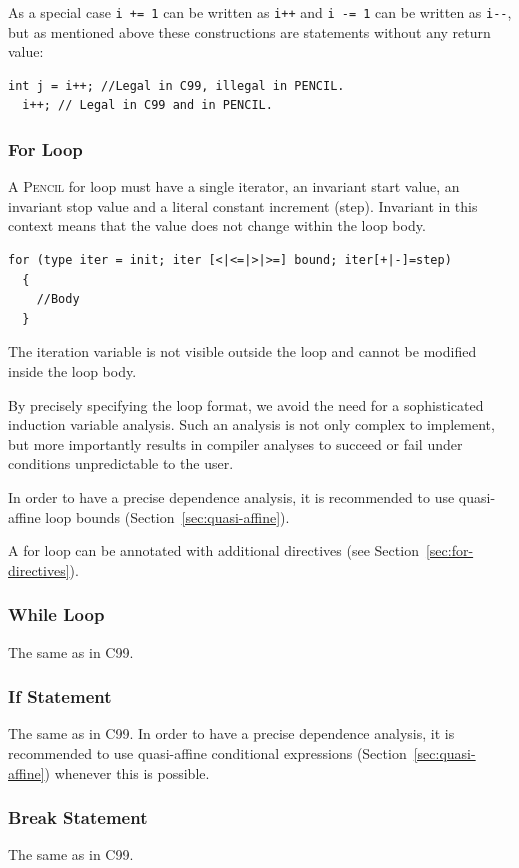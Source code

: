 \documentclass{carp}
\newcommand\pencil{\textsc{Pencil}\xspace}
\newcommand{\C}{C99\xspace}
\begin{document}
As a special case \lstinline!i += 1! can be written as \lstinline!i++!
and \lstinline!i -= 1! can be written as \lstinline!i--!, but as mentioned
above these constructions are statements without any return value:

\begin{lstlisting}[language=pencil]
  int j = i++; //Legal in C99, illegal in PENCIL.
  i++; // Legal in C99 and in PENCIL.
\end{lstlisting}

\subsubsection{For Loop}

A \pencil for loop must have a single iterator, an invariant start
value, an invariant stop value and a literal constant increment (step).
Invariant in this context means that the value does not change within
the loop body.

\begin{lstlisting}[language=pencil]
  for (type iter = init; iter [<|<=|>|>=] bound; iter[+|-]=step)
  {
    //Body
  }
\end{lstlisting}
The iteration variable is not visible outside the loop and cannot be modified
inside the loop body.

By precisely specifying the loop format, we avoid the need for
a sophisticated induction variable analysis.
Such an analysis is not only complex to implement, but more
importantly results in compiler analyses to succeed or fail under
conditions unpredictable to the user.

In order to have a precise dependence analysis, it is recommended
to use quasi-affine loop bounds (Section~\ref{sec:quasi-affine}).

A for loop can be annotated with additional directives
(see Section~\ref{sec:for-directives}).
\subsubsection{While Loop}
The same as in \C.
\subsubsection{If Statement}
The same as in \C.
In order to have a precise dependence analysis, it is recommended
to use quasi-affine conditional expressions (Section~\ref{sec:quasi-affine})
whenever this is possible.
\subsubsection{Break Statement}
The same as in \C.
\end{document}
